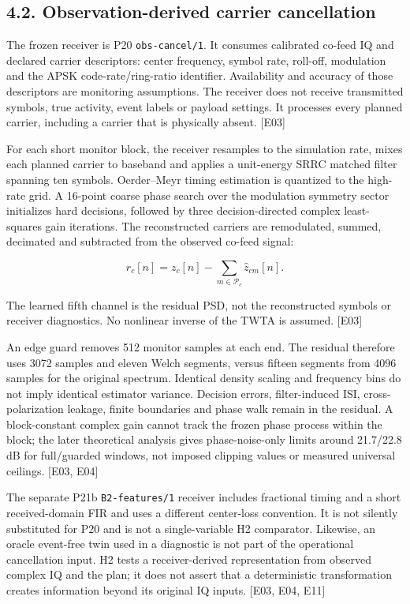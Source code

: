 \documentclass[
  10pt,
]{article}
\begin{document}
\subsection{4.2. Observation-derived carrier
cancellation}\label{observation-derived-carrier-cancellation}

The frozen receiver is P20 \texttt{obs-cancel/1}. It consumes calibrated
co-feed IQ and declared carrier descriptors: center frequency, symbol
rate, roll-off, modulation and the APSK code-rate/ring-ratio identifier.
Availability and accuracy of those descriptors are monitoring
assumptions. The receiver does not receive transmitted symbols, true
activity, event labels or payload settings. It processes every planned
carrier, including a carrier that is physically absent. {[}E03{]}

For each short monitor block, the receiver resamples to the simulation
rate, mixes each planned carrier to baseband and applies a unit-energy
SRRC matched filter spanning ten symbols. Oerder--Meyr timing estimation
is quantized to the high-rate grid. A 16-point coarse phase search over
the modulation symmetry sector initializes hard decisions, followed by
three decision-directed complex least-squares gain iterations. The
reconstructed carriers are remodulated, summed, decimated and subtracted
from the observed co-feed signal:

\[r_c[n]=z_c[n]-\sum_{m\in\mathcal P_c}\widehat z_{cm}[n].\]

The learned fifth channel is the residual PSD, not the reconstructed
symbols or receiver diagnostics. No nonlinear inverse of the TWTA is
assumed. {[}E03{]}

An edge guard removes 512 monitor samples at each end. The residual
therefore uses 3072 samples and eleven Welch segments, versus fifteen
segments from 4096 samples for the original spectrum. Identical density
scaling and frequency bins do not imply identical estimator variance.
Decision errors, filter-induced ISI, cross-polarization leakage, finite
boundaries and phase walk remain in the residual. A block-constant
complex gain cannot track the frozen phase process within the block; the
later theoretical analysis gives phase-noise-only limits around
21.7/22.8 dB for full/guarded windows, not imposed clipping values or
measured universal ceilings. {[}E03, E04{]}

The separate P21b \texttt{B2-features/1} receiver includes fractional
timing and a short received-domain FIR and uses a different center-loss
convention. It is not silently substituted for P20 and is not a
single-variable H2 comparator. Likewise, an oracle event-free twin used
in a diagnostic is not part of the operational cancellation input. H2
tests a receiver-derived representation from observed complex IQ and the
plan; it does not assert that a deterministic transformation creates
information beyond its original IQ inputs. {[}E03, E04, E11{]}
\end{document}
